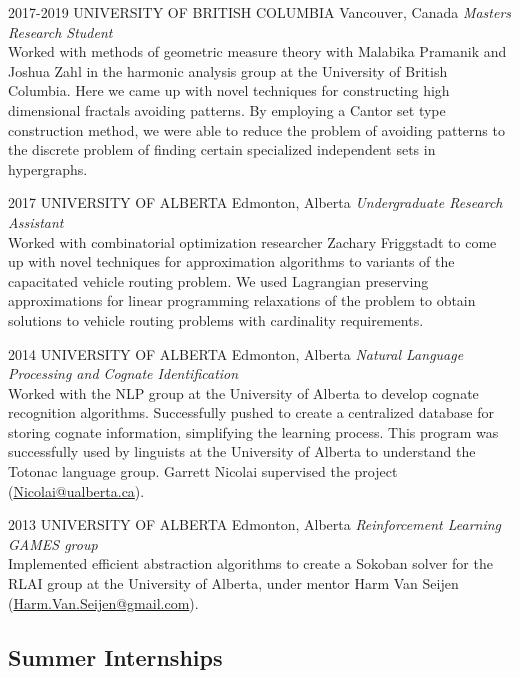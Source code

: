 \documentclass{friggeri-cv}
\begin{document}
\begin{entrylist}

\entry
{2017-2019}
{UNIVERSITY OF BRITISH COLUMBIA}
{Vancouver, Canada}
{\emph{Masters Research Student} \\
Worked with methods of geometric measure theory with Malabika Pramanik and Joshua Zahl in the harmonic analysis group at the University of British Columbia. Here we came up with novel techniques for constructing high dimensional fractals avoiding patterns. By employing a Cantor set type construction method, we were able to reduce the problem of avoiding patterns to the discrete problem of finding certain specialized independent sets in hypergraphs.
}

\entry
{2017}
{UNIVERSITY OF ALBERTA}
{Edmonton, Alberta}
{\emph{Undergraduate Research Assistant} \\
Worked with combinatorial optimization researcher Zachary Friggstadt to come up with novel techniques for approximation algorithms to variants of the capacitated vehicle routing problem. We used Lagrangian preserving approximations for linear programming relaxations of the problem to obtain solutions to vehicle routing problems with cardinality requirements.}

\entry
{2014}
{UNIVERSITY OF ALBERTA}
{Edmonton, Alberta}
{\emph{Natural Language Processing and Cognate Identification} \\
Worked with the NLP group at the University of Alberta to develop cognate recognition algorithms. Successfully pushed to create a centralized database for storing cognate information, simplifying the learning process. This program was successfully used by linguists at the University of Alberta to understand the Totonac language group. Garrett Nicolai supervised the project (\href{mailto:Nicolai@ualberta.ca}{Nicolai@ualberta.ca}).}

\entry
{2013}
{UNIVERSITY OF ALBERTA}
{Edmonton, Alberta}
{\emph{Reinforcement Learning GAMES group} \\
Implemented efficient abstraction algorithms to create a Sokoban solver for the RLAI group at the University of Alberta, under mentor Harm Van Seijen (\href{mailto:Harm.Van.Seijen@gmail.com}{Harm.Van.Seijen@gmail.com}).}


\end{entrylist}

\subsection{Summer Internships}
\end{document}
